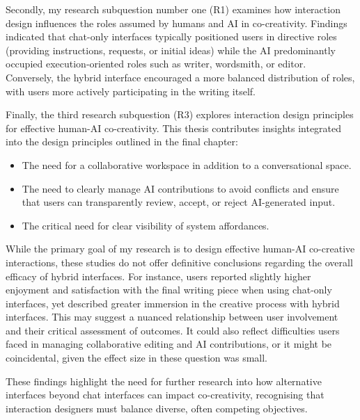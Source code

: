 Secondly, my research subquestion number one (R1) examines how interaction design influences the roles assumed by humans and AI in co-creativity. Findings indicated that chat-only interfaces typically positioned users in directive roles (providing instructions, requests, or initial ideas) while the AI predominantly occupied execution-oriented roles such as writer, wordsmith, or editor. Conversely, the hybrid interface encouraged a more balanced distribution of roles, with users more actively participating in the writing itself.

Finally, the third research subquestion (R3) explores interaction design principles for effective human-AI co-creativity. This thesis contributes insights integrated into the design principles outlined in the final chapter:

\begin{itemize}
    \item The need for a collaborative workspace in addition to a conversational space.
    \item The need to clearly manage AI contributions to avoid conflicts and ensure that users can transparently review, accept, or reject AI-generated input.
    \item The critical need for clear visibility of system affordances.
\end{itemize}

While the primary goal of my research is to design effective human-AI co-creative interactions, these studies do not offer definitive conclusions regarding the overall efficacy of hybrid interfaces. For instance, users reported slightly higher enjoyment and satisfaction with the final writing piece when using chat-only interfaces, yet described greater immersion in the creative process with hybrid interfaces. This may suggest a nuanced relationship between user involvement and their critical assessment of outcomes. It could also reflect difficulties users faced in managing collaborative editing and AI contributions, or it might be coincidental, given the effect size in these question was small.

These findings highlight the need for further research into how alternative interfaces beyond chat interfaces can impact co-creativity, recognising that interaction designers must balance diverse, often competing objectives.



